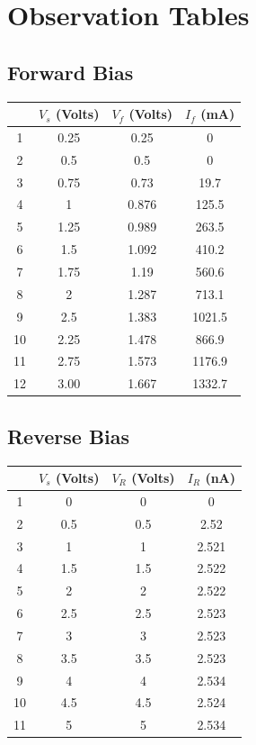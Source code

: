 \documentclass{article}
\begin{document}
	\section{Observation Tables}
	\subsection{Forward Bias}
	\begin{center}
	\begin{tabular}{|c|c|c|c|}
		\hline
		& $ V_s $ (Volts) & $ V_f $ (Volts) & $ I_f $ (mA) \\
		\hline
		1 & 0.25 & 0.25 & 0 \\
		\hline
		2 & 0.5 & 0.5 & 0 \\
		\hline
		3 & 0.75 & 0.73 & 19.7 \\
		\hline
		4 & 1 & 0.876 & 125.5 \\
		\hline
		5 & 1.25 & 0.989 & 263.5 \\
		\hline
		6 & 1.5 & 1.092 & 410.2 \\
		\hline
		7 & 1.75 & 1.19 & 560.6 \\
		\hline
		8 & 2 & 1.287 & 713.1 \\
		\hline
		9 & 2.5 & 1.383 & 1021.5 \\
		\hline
		10 & 2.25 & 1.478 & 866.9 \\
		\hline
		11 & 2.75 & 1.573 & 1176.9 \\
		\hline
		12 & 3.00 & 1.667 & 1332.7 \\
		\hline
	\end{tabular}
	\end{center}
	\subsection{Reverse Bias}
	\begin{center}
	\begin{tabular}{|c|c|c|c|}
		\hline
		& $ V_s $ (Volts) & $ V_R $ (Volts) & $ I_R $ (nA) \\
		\hline
		1 & 0 & 0 & 0 \\
		\hline
		2 & 0.5 & 0.5 & 2.52 \\
		\hline
		3 & 1 & 1 & 2.521 \\
		\hline
		4 & 1.5 & 1.5 & 2.522 \\
		\hline
		5 & 2 & 2 & 2.522 \\
		\hline
		6 & 2.5 & 2.5 & 2.523 \\
		\hline
		7 & 3 & 3 & 2.523 \\
		\hline
		8 & 3.5 & 3.5 & 2.523 \\
		\hline
		9 & 4 & 4 & 2.534 \\
		\hline
		10 & 4.5 & 4.5 & 2.524 \\
		\hline
		11 & 5 & 5 & 2.534 \\
		\hline
	\end{tabular}
	\end{center}	
\end{document}
